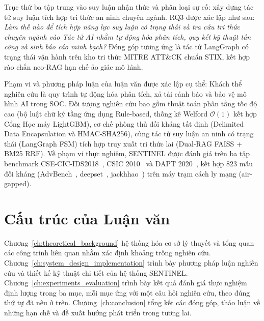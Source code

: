 Trục thứ ba tập trung vào suy luận nhận thức và phân loại sự cố: xây dựng tác tử suy luận tích hợp tri thức an ninh chuyên ngành. RQ3 được xác lập như sau: \textit{Làm thế nào để tích hợp năng lực suy luận có trạng thái và tra cứu tri thức chuyên ngành vào Tác tử AI nhằm tự động hóa phân tích, quy kết kỹ thuật tấn công và sinh báo cáo minh bạch?} Đóng góp tương ứng là tác tử LangGraph có trạng thái vận hành trên kho tri thức MITRE ATT\&CK chuẩn STIX, kết hợp rào chắn neo-RAG hạn chế ảo giác mô hình.

Phạm vi và phương pháp luận của luận văn được xác lập cụ thể: Khách thể nghiên cứu là quy trình tự động hóa phân tích, xả tải cảnh báo và bảo vệ mô hình AI trong SOC. Đối tượng nghiên cứu bao gồm thuật toán phân tầng tốc độ cao (bộ luật chữ ký tầng ứng dụng Rule-based, thống kê Welford $\mathcal{O}(1)$ kết hợp Cổng Học máy LightGBM), cơ chế phòng thủ đối kháng tất định (Delimited Data Encapsulation và HMAC-SHA256), cùng tác tử suy luận an ninh có trạng thái (LangGraph FSM) tích hợp truy xuất tri thức lai (Dual-RAG FAISS + BM25 RRF). Về phạm vi thực nghiệm, SENTINEL được đánh giá trên ba tập benchmark CSE-CIC-IDS2018~\cite{ids2018}, CSIC 2010~\cite{csic2010} và DAPT 2020~\cite{dapt2020}, kết hợp 823 mẫu đối kháng (AdvBench~\cite{advbench2023}, deepset~\cite{deepset2023}, jackhhao~\cite{jackhhao2023}) trên máy trạm cách ly mạng (air-gapped).

\section{Cấu trúc của Luận văn}

Chương~\ref{ch:theoretical_background} hệ thống hóa cơ sở lý thuyết và tổng quan các công trình liên quan nhằm xác định khoảng trống nghiên cứu. Chương~\ref{ch:system_design_implementation} trình bày phương pháp luận nghiên cứu và thiết kế kỹ thuật chi tiết của hệ thống SENTINEL. Chương~\ref{ch:experiments_evaluation} trình bày kết quả đánh giá thực nghiệm định lượng trong ba mục, mỗi mục ứng với một câu hỏi nghiên cứu, theo đúng thứ tự đã nêu ở trên. Chương~\ref{ch:conclusion} tổng kết các đóng góp, thảo luận về những hạn chế và đề xuất hướng phát triển trong tương lai.
